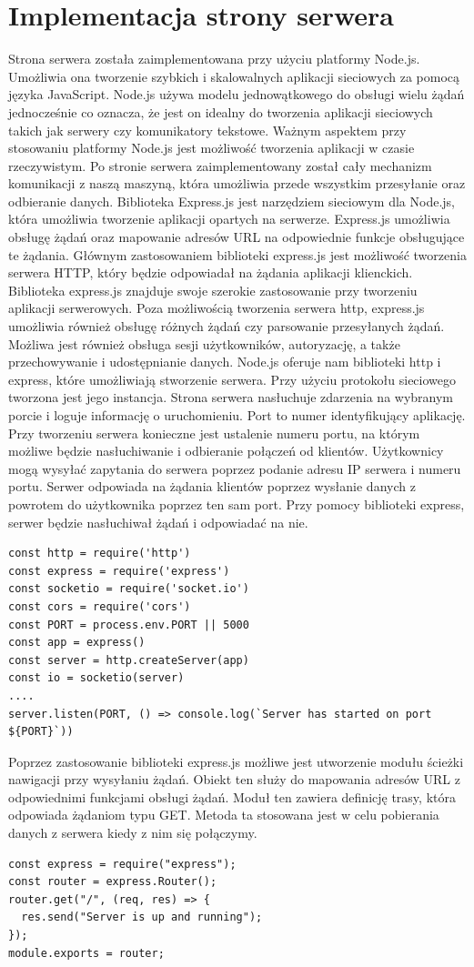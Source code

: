 \section{Implementacja strony serwera}
Strona serwera została zaimplementowana przy użyciu platformy Node.js. Umożliwia ona tworzenie szybkich i skalowalnych aplikacji sieciowych za pomocą języka JavaScript. Node.js używa modelu jednowątkowego do obsługi wielu żądań jednocześnie co oznacza, że jest on idealny do tworzenia aplikacji sieciowych takich jak serwery czy komunikatory tekstowe. Ważnym aspektem przy stosowaniu platformy Node.js jest możliwość tworzenia aplikacji w czasie rzeczywistym. Po stronie serwera zaimplementowany został cały mechanizm komunikacji z naszą maszyną, która umożliwia przede wszystkim przesyłanie oraz odbieranie danych.
Biblioteka Express.js  jest narzędziem sieciowym dla Node.js, która umożliwia tworzenie aplikacji opartych na serwerze. Express.js umożliwia obsługę żądań oraz mapowanie adresów URL na odpowiednie funkcje obsługujące te żądania. Głównym zastosowaniem biblioteki express.js jest możliwość tworzenia serwera HTTP, który będzie odpowiadał na żądania aplikacji klienckich. Biblioteka express.js znajduje swoje szerokie zastosowanie przy tworzeniu aplikacji serwerowych. Poza możliwością tworzenia serwera http, express.js umożliwia również obsługę różnych żądań czy parsowanie przesyłanych żądań. Możliwa jest również obsługa sesji użytkowników, autoryzację, a także przechowywanie i udostępnianie danych.
Node.js oferuje nam biblioteki http i express, które umożliwiają stworzenie serwera. Przy użyciu protokołu sieciowego tworzona jest jego instancja. Strona serwera nasłuchuje zdarzenia na wybranym porcie i loguje informację o uruchomieniu. Port to numer identyfikujący aplikację. Przy tworzeniu serwera konieczne jest ustalenie numeru portu, na którym możliwe będzie nasłuchiwanie i odbieranie połączeń od klientów. Użytkownicy mogą wysyłać zapytania do serwera poprzez podanie adresu IP serwera i numeru portu. Serwer odpowiada na żądania klientów poprzez wysłanie danych z powrotem do użytkownika poprzez ten sam port. Przy pomocy biblioteki express, serwer będzie nasłuchiwał żądań i odpowiadać na nie. 
\begin{lstlisting}[caption=Implementacja serwera]
const http = require('http')
const express = require('express')
const socketio = require('socket.io')
const cors = require('cors')
const PORT = process.env.PORT || 5000
const app = express()
const server = http.createServer(app)
const io = socketio(server)
....
server.listen(PORT, () => console.log(`Server has started on port 
${PORT}`))
\end{lstlisting}
Poprzez zastosowanie biblioteki express.js możliwe jest utworzenie modułu ścieżki nawigacji przy wysyłaniu żądań. Obiekt ten służy do mapowania adresów URL z odpowiednimi funkcjami obsługi żądań. Moduł ten zawiera definicję trasy, która odpowiada żądaniom typu GET. Metoda ta stosowana jest w celu pobierania danych z serwera kiedy z nim się połączymy.
\begin{lstlisting}[caption=Implementacja sciezki serwera]
const express = require("express");
const router = express.Router();
router.get("/", (req, res) => {
  res.send("Server is up and running");
});
module.exports = router;
\end{lstlisting}
